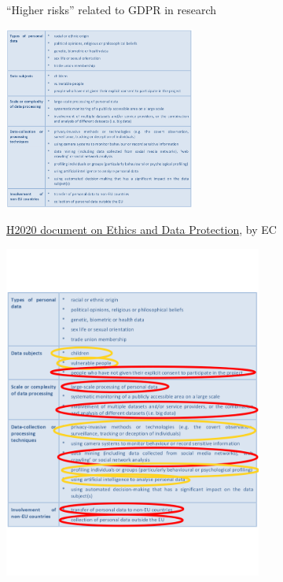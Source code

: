 \documentclass[17pt,aspectratio=169,hyperref={pdfusetitle,colorlinks,allcolors=olive}]{beamer}
\begin{document}
\begin{frame}[fragile]

  ``Higher risks'' related to GDPR in research
  
  \begin{center}
  \includegraphics[height=6cm]{figs/gdpr-higher-risks}
  \end{center}
  
  {\footnotesize
    \begin{flushright}
    \href{https://ec.europa.eu/research/participants/data/ref/h2020/grants_manual/hi/ethics/h2020_hi_ethics-data-protection_en.pdf}{H2020 document on Ethics and Data Protection},  by EC
  \end{flushright}
  }
  
\end{frame}

\begin{frame}[fragile]
  \vspace{-1.6cm}
  \begin{center}
    \includegraphics[height=11cm]{figs/gdpr-higher-risks-annotated}
  \end{center}
\end{frame}
\end{document}
